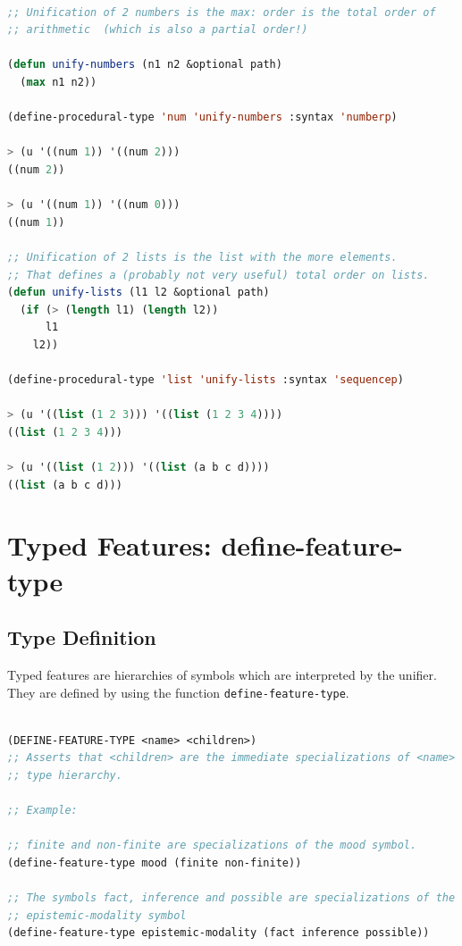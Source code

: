 \documentclass[10pt,a4paper]{report}
\begin{document}
\begin{lstlisting}[language=Lisp]

;; Unification of 2 numbers is the max: order is the total order of
;; arithmetic  (which is also a partial order!)

(defun unify-numbers (n1 n2 &optional path)
  (max n1 n2))

(define-procedural-type 'num 'unify-numbers :syntax 'numberp)

> (u '((num 1)) '((num 2)))
((num 2))

> (u '((num 1)) '((num 0)))
((num 1))

;; Unification of 2 lists is the list with the more elements.
;; That defines a (probably not very useful) total order on lists.
(defun unify-lists (l1 l2 &optional path)
  (if (> (length l1) (length l2))
      l1
    l2))

(define-procedural-type 'list 'unify-lists :syntax 'sequencep)

> (u '((list (1 2 3))) '((list (1 2 3 4))))
((list (1 2 3 4)))

> (u '((list (1 2))) '((list (a b c d))))
((list (a b c d)))
\end{lstlisting}


\section{Typed Features: define-feature-type}
\label{feature-type}

\subsection{Type Definition}

Typed features are hierarchies of symbols which are interpreted by the
unifier.  They are defined by using the function {\tt define-feature-type}.


\begin{lstlisting}[language=Lisp]

(DEFINE-FEATURE-TYPE <name> <children>)
;; Asserts that <children> are the immediate specializations of <name> in a
;; type hierarchy.

;; Example:

;; finite and non-finite are specializations of the mood symbol.
(define-feature-type mood (finite non-finite))

;; The symbols fact, inference and possible are specializations of the
;; epistemic-modality symbol
(define-feature-type epistemic-modality (fact inference possible))
\end{lstlisting}
\end{document}

